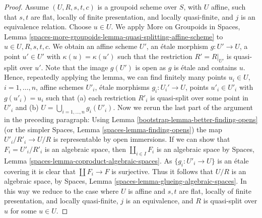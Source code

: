 \begin{proof}
\medskip\noindent
Assume $(U, R, s, t, c)$ is a groupoid scheme over $S$,
with $U$ affine, such that $s, t$ are flat, locally of finite presentation,
and locally quasi-finite, and $j$ is an equivalence relation.
Choose $u \in U$. We apply
More on Groupoids in Spaces,
Lemma \ref{spaces-more-groupoids-lemma-quasi-splitting-affine-scheme}
to $u \in U, R, s, t, c$. We obtain an affine scheme $U'$, an \'etale
morphism $g : U' \to U$, a point $u' \in U'$ with $\kappa(u) = \kappa(u')$
such that the restriction $R' = R|_{U'}$ is quasi-split over $u'$.
Note that the image $g(U')$ is open as $g$ is \'etale and contains $u$.
Hence, repeatedly applying the lemma, we can find finitely many
points $u_i \in U$, $i = 1, \ldots, n$,
affine schemes $U'_i$, \'etale morphisms $g_i : U_i' \to U$, points
$u'_i \in U'_i$ with $g(u'_i) = u_i$ such that (a) each
restriction $R'_i$ is quasi-split over some point in $U'_i$ and
(b) $U = \bigcup_{i = 1, \ldots, n} g_i(U'_i)$.
Now we rerun the last part of the argument in the preceding paragraph:
Using
Lemma \ref{bootstrap-lemma-better-finding-opens}
(or the simpler
Spaces, Lemma \ref{spaces-lemma-finding-opens})
the map $U'_i/R'_i \to U/R$ is representable by open immersions.
If we can show that $F_i = U'_i/R'_i$ is an algebraic space, then
$\coprod_{i \in I} F_i$ is an algebraic space by
Spaces, Lemma \ref{spaces-lemma-coproduct-algebraic-spaces}.
As $\{g_i : U'_i \to U\}$ is an \'etale covering
it is clear that $\coprod F_i \to F$ is surjective. Thus
it follows that $U/R$ is an algebraic space, by
Spaces, Lemma \ref{spaces-lemma-glueing-algebraic-spaces}.
In this way we reduce to the case where $U$ is affine and $s, t$ are flat,
locally of finite presentation, and locally quasi-finite,
$j$ is an equivalence, and $R$ is quasi-split over $u$ for some
$u \in U$.


\end{proof}
